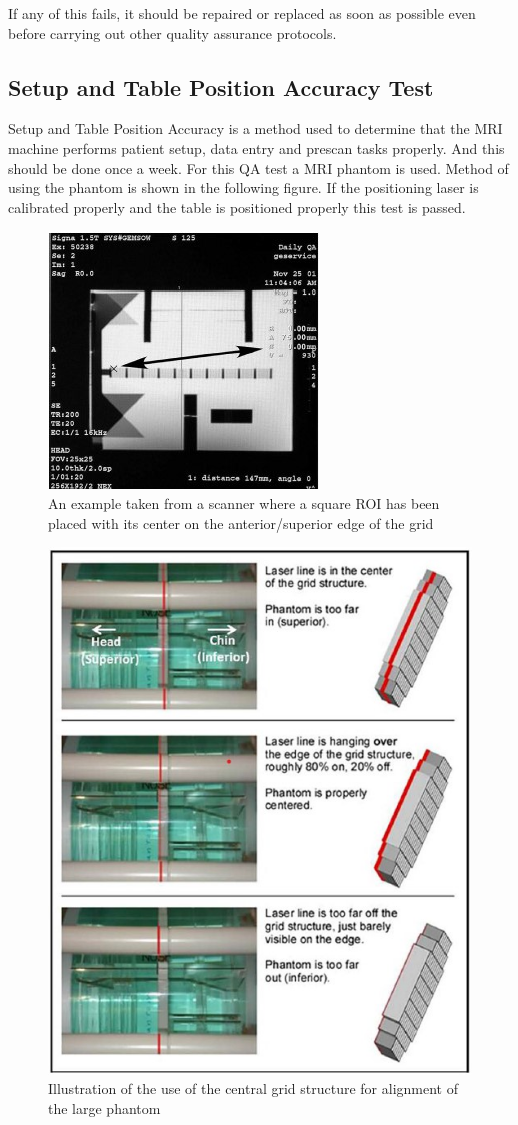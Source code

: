 \documentclass[12pt]{article}
\begin{document}
If any of this fails, it should be repaired or replaced as soon as possible even before carrying out other quality assurance protocols. 

\newcommand{\mysubscript}[1]{\raisebox{-0.34ex}{\scriptsize#1}}

\subsection{Setup and Table Position Accuracy Test}
Setup and Table Position Accuracy is a method used to determine that the MRI machine performs patient setup, data entry and prescan tasks properly. And this should be done once a week. For this QA test a MRI phantom is used. Method of using the phantom is shown in the following figure. If the positioning laser is calibrated properly and the table is positioned properly this test is passed.  
\begin{figure}[h!]
    \centering
    \includegraphics[width=0.3\linewidth]{ph1.jpg}
    \caption{\small{An example taken from a scanner where a square ROI has been placed with its center on the anterior/superior edge of the grid}}
    \label{fig:An example taken from a scanner where a square ROI has been placed
with its center on the anterior/superior edge of the grid}
\end{figure}

\begin{figure}[h!]
    \centering
    \includegraphics[width=0.7\linewidth]{ph.jpg}
    \caption{\small{Illustration of the use of the central grid structure for alignment of the large phantom}}
    \label{fig:Illustration of the use of the central grid structure for alignment of the large phantom}
\end{figure}
\end{document}
